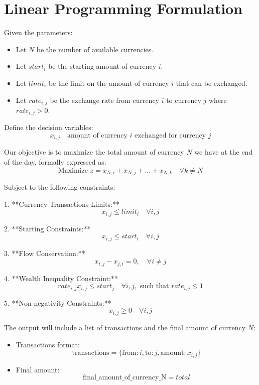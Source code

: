 \documentclass{article}
\begin{document}
\section*{Linear Programming Formulation}

Given the parameters:
\begin{itemize}
    \item Let \( N \) be the number of available currencies.
    \item Let \( start_i \) be the starting amount of currency \( i \).
    \item Let \( limit_i \) be the limit on the amount of currency \( i \) that can be exchanged.
    \item Let \( rate_{i,j} \) be the exchange rate from currency \( i \) to currency \( j \) where \( rate_{i,j} > 0 \).
\end{itemize}

Define the decision variables:
\[
x_{i,j} \quad \text{amount of currency } i \text{ exchanged for currency } j
\]

Our objective is to maximize the total amount of currency \( N \) we have at the end of the day, formally expressed as:
\[
\text{Maximize } z = x_{N,i} + x_{N,j} + \ldots + x_{N,k} \quad \forall k \neq N
\]

Subject to the following constraints:

1. **Currency Transactions Limits:**
   \[
   x_{i,j} \leq limit_i \quad \forall i,j
   \]

2. **Starting Constraints:**
   \[
   x_{i,j} \leq start_i \quad \forall i,j
   \]

3. **Flow Conservation:**
   \[
   x_{i,j} - x_{j,i} = 0, \quad \forall i \neq j
   \]

4. **Wealth Inequality Constraint:**
   \[
   rate_{i,j} x_{i,j} \leq start_j \quad \forall i,j, \text{ such that } rate_{i,j} \leq 1
   \]

5. **Non-negativity Constraints:**
   \[
   x_{i,j} \geq 0 \quad \forall i,j
   \]

The output will include a list of transactions and the final amount of currency \( N \):
\begin{itemize}
    \item Transactions format:
    \[
    \text{transactions} = \{ 
    \text{from}: i, 
    \text{to}: j, 
    \text{amount}: x_{i,j} 
    \}
    \]
    \item Final amount:
    \[
    \text{final\_amount\_of\_currency\_N} = total
    \]
\end{itemize}
\end{document}
